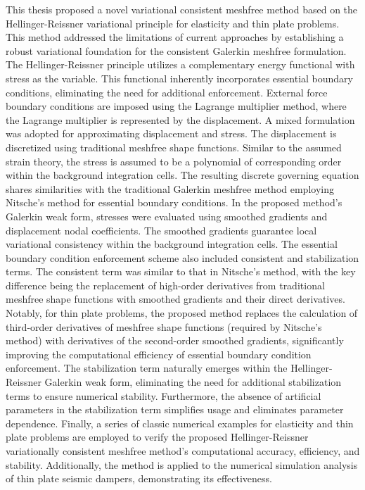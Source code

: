 \begin{abstractEn}
This thesis proposed a novel variational consistent meshfree method based on the Hellinger-Reissner variational principle for elasticity and thin plate problems. 
This method addressed the limitations of current approaches by establishing a robust variational foundation for the consistent Galerkin meshfree formulation. 
The Hellinger-Reissner principle utilizes a complementary energy functional with stress as the variable. This functional inherently incorporates essential boundary conditions, eliminating the need for additional enforcement. 
External force boundary conditions are imposed using the Lagrange multiplier method, where the Lagrange multiplier is represented by the displacement.
A mixed formulation was adopted for approximating displacement and stress. The displacement is discretized using traditional meshfree shape functions. Similar to the assumed strain theory, the stress is assumed to be a polynomial of corresponding order within the background integration cells. The resulting discrete governing equation shares similarities with the traditional Galerkin meshfree method employing Nitsche's method for essential boundary conditions. In the proposed method's Galerkin weak form, stresses were evaluated using smoothed gradients and displacement nodal coefficients. The smoothed gradients guarantee local variational consistency within the background integration cells.
The essential boundary condition enforcement scheme also included consistent and stabilization terms. The consistent term was similar to that in Nitsche's method, with the key difference being the replacement of high-order derivatives from traditional meshfree shape functions with smoothed gradients and their direct derivatives. Notably, for thin plate problems, the proposed method replaces the calculation of third-order derivatives of meshfree shape functions (required by Nitsche's method) with derivatives of the second-order smoothed gradients, significantly improving the computational efficiency of essential boundary condition enforcement.
The stabilization term naturally emerges within the Hellinger-Reissner Galerkin weak form, eliminating the need for additional stabilization terms to ensure numerical stability. Furthermore, the absence of artificial parameters in the stabilization term simplifies usage and eliminates parameter dependence.
Finally, a series of classic numerical examples for elasticity and thin plate problems are employed to verify the proposed Hellinger-Reissner variationally consistent meshfree method's computational accuracy, efficiency, and stability. Additionally, the method is applied to the numerical simulation analysis of thin plate seismic dampers, demonstrating its effectiveness.
\end{abstractEn}
